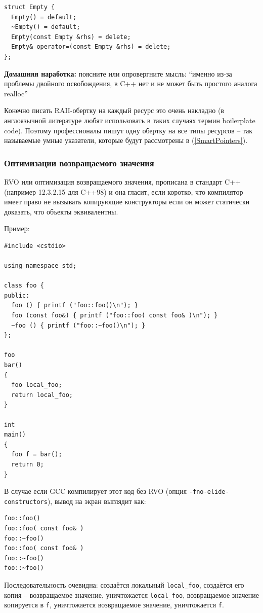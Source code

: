 \documentclass[a4paper,12pt,oneside]{article}
\begin{document}
\begin{lstlisting}
struct Empty {
  Empty() = default;
  ~Empty() = default;
  Empty(const Empty &rhs) = delete;
  Empty& operator=(const Empty &rhs) = delete;
};
\end{lstlisting}

\textbf{Домашняя наработка:} поясните или опровергните мысль: ``именно из-за проблемы двойного освобождения, в C++ нет и не может быть простого аналога realloc''

Конечно писать RAII-обертку на каждый ресурс это очень накладно (в англоязычной литературе любят использовать в таких случаях термин boilerplate code). Поэтому профессионалы пишут одну обертку на все типы ресурсов -- так называемые умные указатели, которые будут рассмотрены в (\ref{SmartPointers}).

\subsubsection{Оптимизации возвращаемого значения}\label{RVO}

RVO или оптимизация возвращаемого значения, прописана в стандарт C++ (например 12.3.2.15 для C++98) и она гласит, если коротко, что компилятор имеет право не вызывать копирующие конструкторы если он может статически доказать, что объекты эквивалентны.

Пример:

\begin{lstlisting}
#include <cstdio>

using namespace std;

class foo {
public:
  foo () { printf ("foo::foo()\n"); }
  foo (const foo&) { printf ("foo::foo( const foo& )\n"); }
  ~foo () { printf ("foo::~foo()\n"); }
};

foo
bar()
{
  foo local_foo;
  return local_foo;
}

int
main()
{
  foo f = bar();
  return 0;
}
\end{lstlisting}

В случае если GCC компилирует этот код без RVO (опция \lstinline!-fno-elide-constructors!), вывод на экран выглядит как:

\begin{lstlisting}
foo::foo()
foo::foo( const foo& )
foo::~foo()
foo::foo( const foo& )
foo::~foo()
foo::~foo()
\end{lstlisting}

Последовательность очевидна: создаётся локальный \lstinline!local_foo!, создаётся его копия -- возвращаемое значение, уничтожается \lstinline!local_foo!, возвращаемое значение копируется в \lstinline!f!, уничтожается возвращаемое значение, уничтожается \lstinline!f!.
\end{document}
